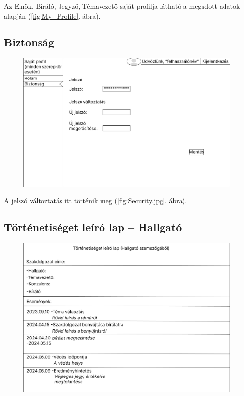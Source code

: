 \documentclass[a4paper,12pt]{article}
\begin{document}
Az Elnök, Bíráló, Jegyző, Témavezető saját profilja látható a megadott adatok alapján (\ref{fig:My_Profile}. ábra).    

\subsection{Biztonság}

\begin{figure}
	\centering
	\includegraphics[width=\textwidth]{images/Web_pages/Security.jpg}
	\caption{}
	\label{fig:Security}
\end{figure}

A jelszó változtatás itt történik meg (\ref{fig:Security.jpg}. ábra).

\subsection{Történetiséget leíró lap -- Hallgató}

\begin{figure}
	\centering
	\includegraphics[width=\textwidth]{images/Web_pages/History_Student.jpg}
	\caption{}
	\label{fig:History_Student}
\end{figure}
\end{document}
